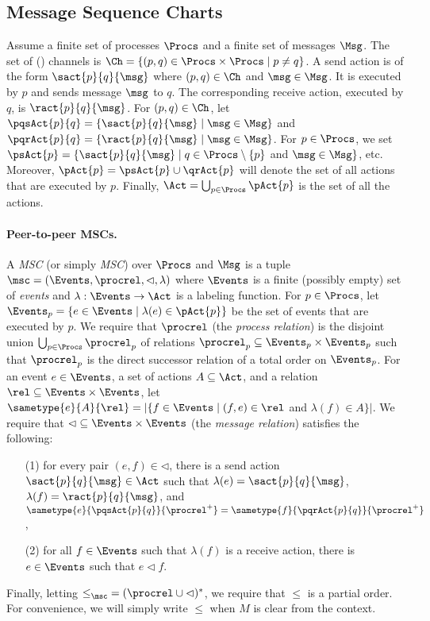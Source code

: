 
\subsection{Message Sequence Charts}

Assume a finite set of processes $\Procs$ and a finite set of messages $\Msg$.
The set of (\pp) channels is $\Ch = \{(p,q) \in \Procs \times \Procs \mid p \neq q\}$.
%
A send action is of the form $\sact{p}{q}{\msg}$
where $(p,q) \in \Ch$ and $\msg \in \Msg$.
It is executed by $p$ and sends message $\msg$ to $q$.
The corresponding receive action, executed by $q$, is
$\ract{p}{q}{\msg}$.
%
For $(p,q) \in \Ch$, let
$\pqsAct{p}{q} = \{\sact{p}{q}{\msg} \mid \msg \in \Msg\}$ and
$\pqrAct{p}{q} = \{\ract{p}{q}{\msg} \mid \msg \in \Msg\}$.
For $p \in \Procs$, we set
$\psAct{p} = \{\sact{p}{q}{\msg} \mid q \in \Procs \setminus \{p\}$ and $\msg \in \Msg\}$, etc.
Moreover, $\pAct{p} = \psAct{p} \cup \qrAct{p}$ will denote the set of all actions that are
executed by $p$.
Finally, $\Act = \bigcup_{p \in \Procs} \pAct{p}$
is the set of all the actions.

\paragraph*{Peer-to-peer MSCs.}
A \emph{\pp MSC} (or simply \emph{MSC}) over $\Procs$ and $\Msg$ is a tuple $\msc = (\Events,\procrel,\lhd,\lambda)$
where $\Events$ is a finite (possibly empty) set of \emph{events}
and $\lambda: \Events \to \Act$ is a labeling function.
For $p \in \Procs$, let $\Events_p = \{e \in \Events \mid \lambda(e) \in \pAct{p}\}$ be the set of events
that are executed by $p$.
We require that $\procrel$ (the \emph{process relation}) is the disjoint union $\bigcup_{p \in \Procs} \procrel_p$
of relations ${\procrel_p} \subseteq \Events_p \times \Events_p$ such that
$\procrel_p$ is the direct successor relation of a total order on $\Events_p$.
For an event $e \in \Events$, a set of actions $A \subseteq \Act$, and a relation $\rel \subseteq \Events \times \Events$,
let $\sametype{e}{A}{\rel} = |\{f \in \Events \mid (f,e) \in \rel$ and $\lambda(f) \in A\}|$.
We require that ${\lhd} \subseteq \Events \times \Events$ (the \emph{message relation}) satisfies the following:
\begin{itemize}\itemsep=0.5ex
\item[(1)] for every pair $(e,f) \in {\lhd}$, there is a send action $\sact{p}{q}{\msg} \in \Act$ such that
$\lambda(e) = \sact{p}{q}{\msg}$, $\lambda(f) = \ract{p}{q}{\msg}$, and
$\sametype{e}{\pqsAct{p}{q}}{\procrel^+} = \sametype{f}{\pqrAct{p}{q}}{\procrel^+}$,
\item[(2)] for all $f \in \Events$ such that $\lambda(f)$ is a receive action, there is $e \in \Events$ such that $e \lhd f$.
\end{itemize}
Finally, letting ${\le}_\msc = ({\procrel} \cup {\lhd})^\ast$,
we require that $\le$ is a partial order. For convenience, we will simply write $\le$ when $M$ is clear from the context.

